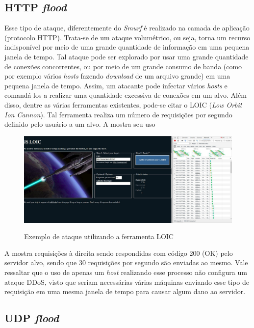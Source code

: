 \subsection{HTTP \textit{flood}}
Esse tipo de ataque, diferentemente do \textit{Smurf} é realizado na camada de aplicação (protocolo HTTP). Trata-se de um ataque volumétrico, ou seja, torna um recurso indisponível por meio de uma grande quantidade de informação em uma pequena janela de tempo. Tal ataque pode ser explorado por  usar uma grande quantidade de conexões concorrentes, ou por meio de um grande consumo de banda (como por exemplo vários \textit{hosts} fazendo \textit{download} de um arquivo grande) em uma pequena janela de tempo. Assim, um atacante pode infectar vários \textit{hosts} e comandá-los a realizar uma quantidade excessiva de conexões em um alvo. Além disso, dentre as várias ferramentas existentes, pode-se citar o LOIC (\textit{Low Orbit Ion Cannon}). Tal ferramenta realiza um número de requisições por segundo definido pelo usuário a um alvo. A  mostra seu uso 
 
 \begin{figure}[ht]
 	\centering
 	\caption{Exemplo de ataque utilizando a ferramenta LOIC }
 	\includegraphics[width=1\textwidth]{figs/loic.pdf}\\
 	\label{fig:loic}
 \end{figure} 
 
 A  mostra requisições à direita sendo respondidas com código 200 (OK) pelo servidor alvo, sendo que 30 requisições por segundo são enviadas ao mesmo. Vale ressaltar que o uso de apenas um \textit{host} realizando  esse processo não configura um ataque DDoS, visto que seriam necessárias várias máquinas enviando esse tipo de requisição em uma mesma janela de tempo para causar algum dano ao servidor.
 
 \subsection{UDP \textit{flood}}
 
